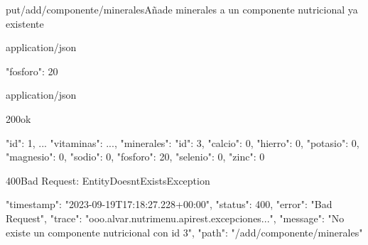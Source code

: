 \begin{apiRoute}{put}{/add/componente/minerales}{Añade minerales a un componente nutricional ya existente}
	\begin{routeParameter}
	\end{routeParameter}
	
	\begin{routeRequest}{application/json}
		\begin{routeRequestBody}
{
	"fosforo": 20
}
		\end{routeRequestBody}
	\end{routeRequest}
	\begin{routeResponse}{application/json}
		\begin{routeResponseItem}{200}{ok}
			\begin{routeResponseItemBody}
{
    "id": 1,
    ...
    "vitaminas":
        {...},
    "minerales": {
        "id": 3,
        "calcio": 0,
        "hierro": 0,
        "potasio": 0,
        "magnesio": 0,
        "sodio": 0,
        "fosforo": 20,
        "selenio": 0,
        "zinc": 0
    }
}
			\end{routeResponseItemBody}
		\end{routeResponseItem}
		\begin{routeResponseItem}{400}{Bad Request: EntityDoesntExistsException}
			\begin{routeResponseItemBody}
{
    "timestamp": "2023-09-19T17:18:27.228+00:00",
    "status": 400,
    "error": "Bad Request",
    "trace": "ooo.alvar.nutrimenu.apirest.excepciones...",
    "message": "No existe un componente nutricional con id 3",
    "path": "/add/componente/minerales"
}
			\end{routeResponseItemBody}
		\end{routeResponseItem}
	\end{routeResponse}
\end{apiRoute}

